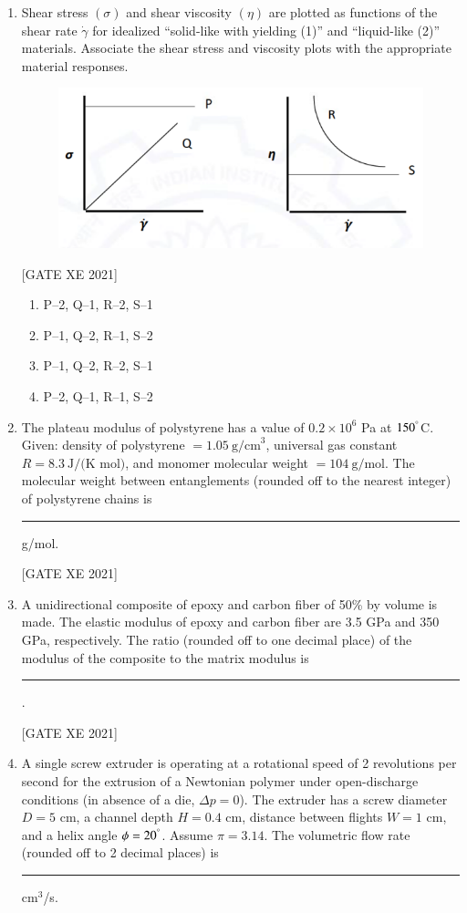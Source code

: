 \documentclass[journal,12pt,onecolumn]{IEEEtran}
\theoremstyle{remark}
\begin{document}
\begin{enumerate}[resume]
\item Shear stress $(\sigma)$ and shear viscosity $(\eta)$ are plotted as functions of the shear rate $\dot{\gamma}$ for idealized “solid-like with yielding (1)” and “liquid-like (2)” materials. Associate the shear stress and viscosity plots with the appropriate material responses.

\begin{figure}[H]
      \centering
      \includegraphics[width=0.5\columnwidth]{figs/fig33.png}
      \caption{}
      \label{fig:placeholder}
  \end{figure}

\hfill[GATE XE 2021]

\begin{multicols}{2}
\begin{enumerate}
\item P–2, Q–1, R–2, S–1
\item P–1, Q–2, R–1, S–2
\item P–1, Q–2, R–2, S–1
\item P–2, Q–1, R–1, S–2
\end{enumerate}
\end{multicols}


\item The plateau modulus of polystyrene has a value of $0.2\times10^6$ Pa at $150^\degree$C. Given: density of polystyrene $=1.05\ \text{g/cm}^3$, universal gas constant $R=8.3\ \text{J/(K mol)}$, and monomer molecular weight $=104\ \text{g/mol}$. The molecular weight between entanglements (rounded off to the nearest integer) of polystyrene chains is \rule{3cm}{0.15mm} g/mol.

\hfill[GATE XE 2021]


\item A unidirectional composite of epoxy and carbon fiber of 50\% by volume is made. The elastic modulus of epoxy and carbon fiber are 3.5 GPa and 350 GPa, respectively. The ratio (rounded off to one decimal place) of the modulus of the composite to the matrix modulus is \rule{3cm}{0.15mm}.

\hfill[GATE XE 2021]


\item A single screw extruder is operating at a rotational speed of 2 revolutions per second for the extrusion of a Newtonian polymer under open-discharge conditions (in absence of a die, $\Delta p=0$). The extruder has a screw diameter $D=5$ cm, a channel depth $H=0.4$ cm, distance between flights $W=1$ cm, and a helix angle $\phi=20^\degree$. Assume $\pi=3.14$. The volumetric flow rate (rounded off to 2 decimal places) is \rule{3cm}{0.15mm} cm$^3$/s.


\end{enumerate}
\end{document}
